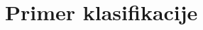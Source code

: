 \documentclass[12pt,a4paper]{article}
\begin{document}








 














\section{Primer klasifikacije}
\end{document}
